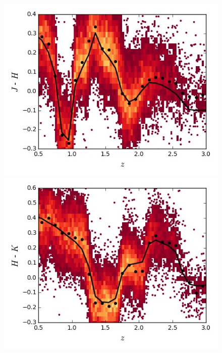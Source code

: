 \begin{figure}
  \centering
  \begin{minipage}[b]{0.49\textwidth}
    \includegraphics[width=\textwidth]{figures/chapter06/sed_color_plots/jh.jpg}
  \end{minipage}
  \begin{minipage}[b]{0.49\textwidth}
    \includegraphics[width=\textwidth]{figures/chapter06/sed_color_plots/hk.jpg}
  \end{minipage} \\
\begin{minipage}[b]{0.49\textwidth}

\end{minipage}
\end{figure}
